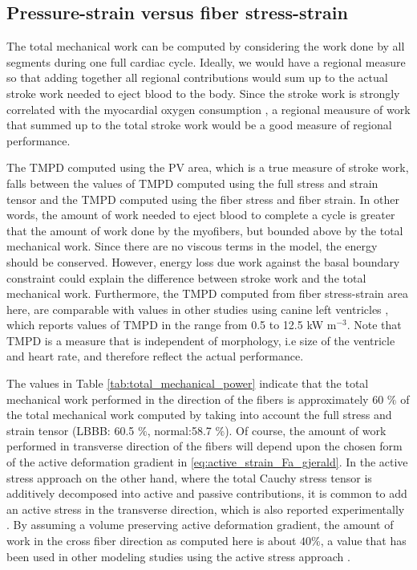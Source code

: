 \subsection{Pressure-strain versus fiber stress-strain}

The total mechanical work can be computed by considering the work done
by all segments during one full cardiac cycle. Ideally, we would have
a regional measure so that adding together all regional contributions
would sum up to the actual stroke work needed to eject blood to the
body. Since the stroke work is strongly correlated with the myocardial
oxygen consumption \cite{suga1979total}, a regional meausure of work
that summed up to the total stroke work would be a good measure of
regional performance. 

The TMPD computed using the PV area, which is a true measure of stroke
work, falls between the values of TMPD computed using the full stress
and strain tensor and the TMPD computed using the fiber stress and
fiber strain. In other words, the amount of work needed to eject blood
to complete a cycle is greater that the amount of work done by the
myofibers, but bounded above by the total mechanical work. Since there
are no viscous terms in the model, the energy should be
conserved. However, energy loss due work against the basal boundary
constraint could explain the difference between stroke work and the
total mechanical work. Furthermore, the TMPD computed from fiber
stress-strain area here, are comparable with values in other studies
using canine left ventricles \cite{delhaas1994regional}, which reports
values of TMPD in the range from 0.5 to 12.5 kW m$^{-3}$. Note that
TMPD is a measure that is independent of morphology, i.e size of the
ventricle and heart rate, and therefore reflect the actual performance.

The values in Table \ref{tab:total_mechanical_power} indicate that the
total mechanical work performed in the direction of the fibers is
approximately 60 $\%$ of the 
total mechanical work computed by taking into account the full stress
and strain tensor (LBBB: 60.5 $\%$, normal:58.7 $\%$). Of course, the
amount of work performed in transverse direction of the fibers will depend upon the
chosen form of the active deformation gradient in
\eqref{eq:active_strain_Fa_gjerald}. In the active stress approach on 
the other hand, where the total Cauchy stress tensor is additively decomposed into
active and passive contributions, it is common to add an active stress
in the transverse direction, which is also reported
experimentally \cite{lin1998multiaxial}. By assuming
a volume preserving active deformation gradient, the amount of
work in the cross fiber direction as computed here is about $40 \%$, a
value that has been used in other modeling studies using the active
stress approach \cite{sun2009computationally}.

